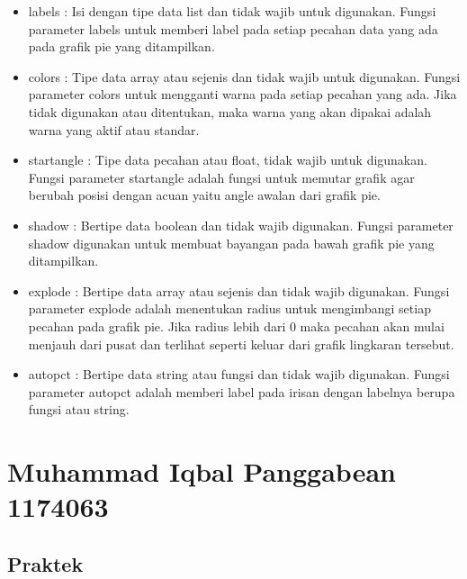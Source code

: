\begin {enumerate}
\begin{itemize}
	\item labels : Isi dengan tipe data list dan tidak wajib untuk digunakan. Fungsi parameter labels untuk memberi label pada setiap pecahan data yang ada pada grafik pie yang ditampilkan.
	\item colors : Tipe data array atau sejenis dan tidak wajib untuk digunakan. Fungsi parameter colors untuk mengganti warna pada setiap pecahan yang ada. Jika tidak digunakan atau ditentukan, maka warna yang akan dipakai adalah warna yang aktif atau standar.
	\item startangle : Tipe data pecahan atau float, tidak wajib untuk digunakan. Fungsi parameter startangle adalah fungsi untuk memutar grafik agar berubah posisi dengan acuan yaitu angle awalan dari grafik pie.
	\item shadow : Bertipe data boolean dan tidak wajib digunakan. Fungsi parameter shadow digunakan untuk membuat bayangan pada bawah grafik pie yang ditampilkan. 
	\item explode : Bertipe data array atau sejenis dan tidak wajib digunakan. Fungsi parameter explode adalah menentukan radius untuk mengimbangi setiap pecahan pada grafik pie. Jika radius lebih dari 0 maka pecahan akan mulai menjauh dari pusat dan terlihat seperti keluar dari grafik lingkaran tersebut.
	\item autopct : Bertipe data string atau fungsi dan tidak wajib digunakan. Fungsi parameter autopct adalah memberi label pada irisan dengan labelnya berupa fungsi atau string. 
			\end{itemize}
	\end {enumerate}
	
\section{Muhammad Iqbal Panggabean 1174063}
\subsection{Praktek}
